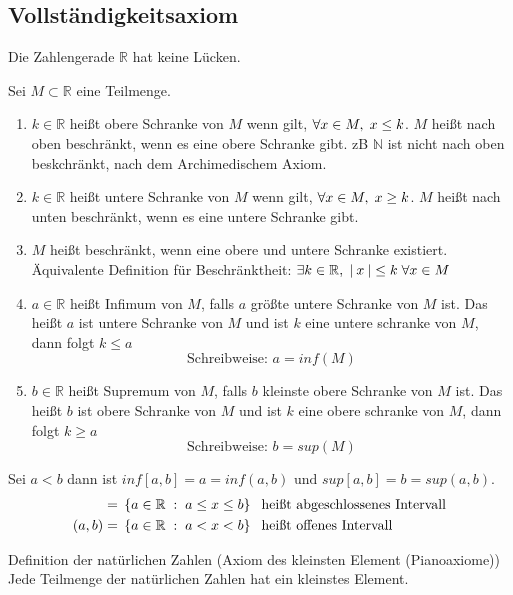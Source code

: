 \documentclass[a4paper,titlepage,oneside]{article}
\def\N{\ensuremath{\mathbb{N}} }
\def\R{\ensuremath{\mathbb{R}} }
\def\fa{\ensuremath{\forall}}
\def\sp{\hspace{0,1cm}}
\newcommand{\abs}[1]{\ensuremath{\left|\:#1\:\right|}}
\newcommand{\menge}[2]{\ensuremath{\left\{#1\sp : \sp #2\right\}}}
\theoremstyle{thmstyle}
\begin{document}
\subsection{Vollständigkeitsaxiom}
Die Zahlengerade \R hat keine Lücken.

\begin{subdefi}
Sei \(M \subset \R\) eine Teilmenge.
\begin{enumerate}
	\item \(k \in \R\) heißt obere Schranke von \(M\) wenn gilt, \(\fa x \in M,\sp x \le k\). \(M\) heißt nach oben beschränkt,
		wenn es eine obere Schranke gibt. zB \N ist nicht nach oben beskchränkt, nach dem Archimedischem Axiom.
	\item \(k \in \R \) heißt untere Schranke von \(M\) wenn gilt, \(\fa x \in M,\sp x \ge k\). \(M\) heißt nach unten beschränkt,
		wenn es eine untere Schranke gibt.
	\item \(M\) heißt beschränkt, wenn eine obere und untere Schranke existiert.  Äquivalente Definition für Beschränktheit:
		\(\exists k \in \R,\sp \abs{x} \le k \sp \fa x \in M\)
	\item \(a \in \R\) heißt Infimum von \(M\), falls \(a\) größte untere Schranke von \(M\) ist. Das heißt \(a\) ist untere Schranke
		von \(M\) und ist \(k\) eine untere schranke von \(M\), dann folgt \(k \le a\)
		\[\text{Schreibweise: } a = inf(M)\]
	\item \(b \in \R\) heißt Supremum von \(M\), falls \(b\) kleinste obere Schranke von \(M\) ist. Das heißt \(b\) ist obere
		Schranke von \(M\) und ist \(k\) eine obere schranke von \(M\), dann folgt \(k \ge a\) \[\text{Schreibweise: } b = sup(M)\]
\end{enumerate}
\end{subdefi}

\begin{subbsp}
Sei \(a < b\) dann ist \(inf[a,b] = a = inf(a,b) \text{ und } sup[a,b] = b = sup(a,b)\).
\begin{align*}
[a, b] = &\sp \menge{a \in \R}{a \le x \le b} \sp \text{ heißt abgeschlossenes Intervall}\\
(a, b) = &\sp \menge{a \in \R}{a < x < b} \sp \text{ heißt offenes Intervall}
\end{align*}
\end{subbsp}

\begin{subbem}
Definition der natürlichen Zahlen (Axiom des kleinsten Element (Pianoaxiome)) \\
Jede Teilmenge der natürlichen Zahlen hat ein kleinstes Element.
\end{subbem}
\end{document}

